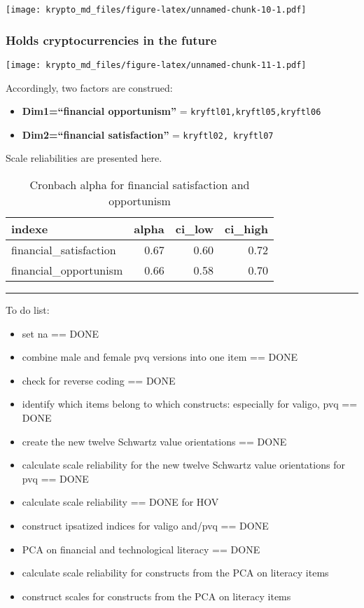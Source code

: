 \documentclass[doc]{apa7}
\providecommand{\tightlist}{%
  \setlength{\itemsep}{0pt}\setlength{\parskip}{0pt}}
\begin{document}
\texttt{[image: krypto\_md\_files/figure-latex/unnamed-chunk-10-1.pdf]}

\hypertarget{holds-cryptocurrencies-in-the-future}{%
\subsubsection{Holds cryptocurrencies in the
future}\label{holds-cryptocurrencies-in-the-future}}

\texttt{[image: krypto\_md\_files/figure-latex/unnamed-chunk-11-1.pdf]}

Accordingly, two factors are construed:

\begin{itemize}
\tightlist
\item
  \textbf{Dim1=``financial opportunism''} =
  \texttt{kryftl01,kryftl05,kryftl06}
\item
  \textbf{Dim2=``financial satisfaction''} =
  \texttt{kryftl02,\ kryftl07}
\end{itemize}

Scale reliabilities are presented here.

\begin{table}

\caption{\label{tab:unnamed-chunk-12}Cronbach alpha for financial satisfaction and opportunism}
\centering
\begin{tabular}[t]{l|r|r|r}
\hline
indexe & alpha & ci\_low & ci\_high\\
\hline
financial\_satisfaction & 0.67 & 0.60 & 0.72\\
\hline
financial\_opportunism & 0.66 & 0.58 & 0.70\\
\hline
\end{tabular}
\end{table}

\begin{center}\rule{0.5\linewidth}{0.5pt}\end{center}

To do list:

\begin{itemize}
\tightlist
\item
  set na == DONE
\item
  combine male and female pvq versions into one item == DONE
\item
  check for reverse coding == DONE
\item
  identify which items belong to which constructs: especially for
  valigo, pvq == DONE
\item
  create the new twelve Schwartz value orientations == DONE
\item
  calculate scale reliability for the new twelve Schwartz value
  orientations for pvq == DONE
\item
  calculate scale reliability == DONE for HOV
\item
  construct ipsatized indices for valigo and/pvq == DONE
\item
  PCA on financial and technological literacy == DONE
\item
  calculate scale reliability for constructs from the PCA on literacy
  items
\item
  construct scales for constructs from the PCA on literacy items
\end{itemize}
\end{document}
